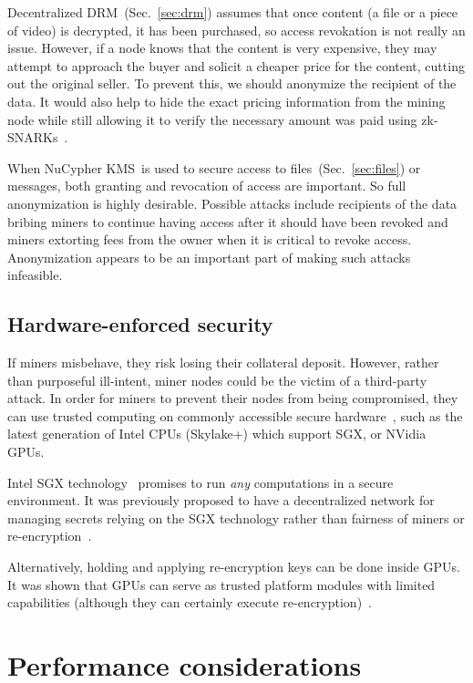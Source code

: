 \documentclass[longbibliography,nofootinbib]{revtex4-1}
\newcommand{\kms}{NuCypher KMS}
\begin{document}
\begin{CJK*}{UTF8}{gbsn}
Decentralized DRM~(Sec.~\ref{sec:drm}) assumes that once content (a file or a piece of video) is decrypted, it has been purchased,
so access revokation is not really an issue.
However, if a node knows that the content is very expensive, they may attempt to approach the buyer and solicit a cheaper price for the
content, cutting out the original seller.
To prevent this, we should anonymize the recipient of the data.
It would also help to hide the exact pricing information from the mining node while still allowing it to verify the necessary amount was paid using
zk-SNARKs~\cite{consensys-snarks}.

When \kms~is used to secure access to files~(Sec.~\ref{sec:files}) or messages, both granting and revocation of access are important.
So full anonymization is highly desirable.
Possible attacks include recipients of the data bribing miners to continue having access after it should have been revoked and
miners extorting fees from the owner when it is critical to revoke access.
Anonymization appears to be an important part of making such attacks infeasible.

\subsection{Hardware-enforced security}

If miners misbehave, they risk losing their collateral deposit.
However, rather than purposeful ill-intent, miner nodes could be the victim of a third-party attack.
In order for miners to prevent their nodes from being compromised, they can use trusted computing on commonly accessible secure hardware~\cite{Yang2011},
such as the latest generation of Intel CPUs (Skylake+) which support SGX, or NVidia GPUs.

Intel SGX technology~\cite{wiki:sgx} promises to run \emph{any} computations in a secure environment.
It was previously proposed to have a decentralized network for managing secrets relying on the SGX technology rather than fairness of
miners or re-encryption~\cite{sgx-blockchain-encryption}.

Alternatively, holding and applying re-encryption keys can be done inside GPUs.
It was shown that GPUs can serve as trusted platform modules with limited capabilities (although they can certainly execute
re-encryption)~\cite{gpu-trusted}.

\section{Performance considerations}


\end{CJK*}
\end{document}
